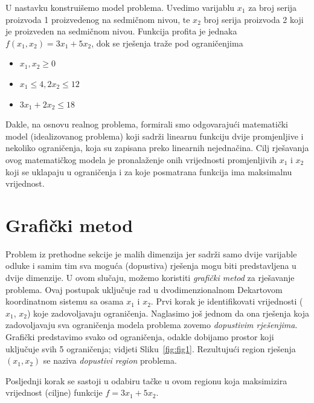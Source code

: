 \documentclass[a4paper, utf8, 11pt, colorlinks]{book}
\begin{document}
U nastavku konstruišemo model problema. Uvedimo varijablu $x_1$ za broj serija proizvoda 1 proizvedenog na sedmičnom nivou, te $x_2$ broj serija proizvoda 2 koji je proizveden na sedmičnom nivou. Funkcija profita je jednaka $f(x_1, x_2) = 3 x_1 + 5 x_2$, dok se rješenja traže pod ograničenjima
\begin{itemize}
    \item $x_1, x_2 \geq 0$
    \item  $x_1 \leq 4, 2 x_2 \leq 12$
    \item $3 x_1 + 2 x_2 \leq 18$
\end{itemize}

Dakle, na osnovu realnog problema, formirali smo odgovarajući matematički model (idealizovanog problema) koji sadrži  linearnu funkciju dvije promjenljive i nekoliko ograničenja, koja su zapisana preko linearnih nejednačina. Cilj rješavanja ovog matematičkog modela je pronalaženje onih vrijednosti promjenljivih $x_1$ i $x_2$ koji se uklapaju u ograničenja i za koje posmatrana funkcija ima maksimalnu vrijednost.

\section{Grafički metod}
 Problem iz prethodne sekcije je malih dimenzija jer sadrži samo dvije varijable odluke i samim tim sva moguća (dopustiva) rješenja mogu biti predstavljena u dvije dimenzije. U ovom slučaju, možemo koristiti \emph{grafički metod} za rješavanje problema. Ovaj postupak uključuje rad u dvodimenzionalnom Dekartovom koordinatnom sistemu sa osama $x_1$ i $x_2$.  Prvi korak je identifikovati vrijednosti ($x_1$, $x_2$) koje zadovoljavaju ograničenja. Naglasimo još jednom da ona rješenja koja zadovoljavaju sva ograničenja modela  problema zovemo \emph{dopustivim rješenjima}. Grafički predstavimo svako od ograničenja, odakle dobijamo prostor koji uključuje svih 5 ograničenja; vidjeti Sliku~\ref{fig:fig1}.  Rezultujući region rješenja $(x_1, x_2)$ se naziva \emph{dopustivi region} problema.
 
 Posljednji korak se sastoji u odabiru tačke u ovom regionu  koja maksimizira vrijednost (ciljne) funkcije $f = 3x_1 + 5x_2$. 
\end{document}
